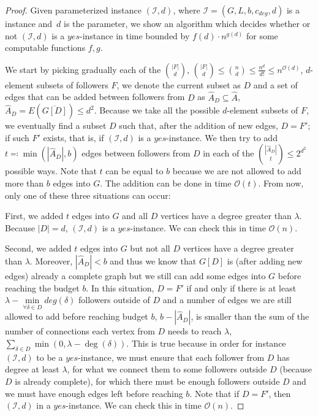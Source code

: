 \begin{proof}\label{proof:XPd}
    Given parameterized instance $(\mathcal{I}, d)$, where $\mathcal{I} = (G, L, b, c_{deg}, d)$ is a \HLdeg instance and~$d$ is the parameter,
    we show an algorithm which decides whether or not $(\mathcal{I}, d)$ is a $yes$-instance in time bounded by
    $f(d) \cdot n^{g(d)}$ for some computable functions $f,g$.

    We start by picking gradually each of the $\binom{|F|}{d}$,
    $\binom{|F|}{d} \leq \binom{n}{d} \leq \frac{n^{d}}{d!} \leq n^{\mathcal{O}(d)}$,
    $d$-element subsets of followers $F$,
    we denote the current subset as $D$ and a set of edges that can be added between followers from $D$
    as $\hat{A}_D \subseteq \hat{A}$, $\hat{A}_D = E(\overline{G[D]}) \leq d^2$.
    Because we take all the possible $d$-element subsets of $F$, we eventually find a subset $D$ such that,
    after the addition of new edges, $D = F'$;
    if such $F'$ exists, that is, if $(\mathcal{I}, d)$ is a $yes$-instance.
    We then try to add $t \eqqcolon \min(|\hat{A}_D|, b)$ edges between followers from $D$
    in each of the $\binom{|\hat{A}_D|}{t} \leq 2^{d^2}$ possible ways.
    Note that $t$ can be equal to $b$ because we are not allowed to add more than $b$ edges into $G$.
    The addition can be done in time $\mathcal{O}(t)$.
    From now, only one of these three situations can occur:

    First, we added $t$ edges into $G$ and all $D$ vertices have a degree greater than $\lambda$.
    Because $|D| = d$, $(\mathcal{I}, d)$ is a $yes$-instance.
    We can check this in time $\mathcal{O}(n)$.
    
    Second, we added $t$ edges into $G$ but not all $D$ vertices have a degree greater than $\lambda$.
    Moreover, $|\hat{A}_D| < b$ and thus we know that $G[D]$ is (after adding new edges) already a complete graph
    but we still can add some edges into $G$ before reaching the budget $b$. 
    In this situation, $D = F'$ if and only if there is at least $\lambda - \min\limits_{\forall \delta \in D}deg(\delta)$ followers
    outside of $D$ and a number of edges we are still allowed to add before reaching budget $b$, $b - |\hat{A}_D|$,
    is smaller than the sum of the number of connections each vertex from $D$ needs to reach $\lambda$,
    $\sum_{\delta \in D} \min(0, \lambda - \deg(\delta))$.
    This is true because in order for instance $(\mathcal{I}, d)$ to be a $yes$-instance, we must
    ensure that each follower from $D$ has degree at least $\lambda$, for what we connect them to some followers
    outside $D$ (because $D$ is already complete), for which there must be enough followers outside $D$ and
    we must have enough edges left before reaching $b$.
    Note that if $D = F'$, then $(\mathcal{I}, d)$ in a $yes$-instance.
    We can check this in time $\mathcal{O}(n)$.
    

\end{proof}
